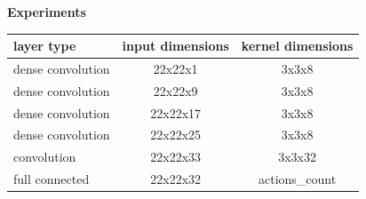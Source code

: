 \documentclass[xcolor=dvipsnames]{beamer}
\begin{document}
\begin{frame}{\bf Experiments}
  \tiny
  {
    \begin{table}[]
    \centering
    \begin{tabular}{|l|c|c|}
    \hline
    \textbf{layer type}                       & \textbf{input dimensions} & \textbf{kernel dimensions} \\ \hline
    \cellcolor[HTML]{FD6864}dense convolution & 22x22x1                   & 3x3x8                      \\ \hline
    \cellcolor[HTML]{FD6864}dense convolution & 22x22x9                  & 3x3x8                      \\ \hline
    \cellcolor[HTML]{FD6864}dense convolution & 22x22x17                  & 3x3x8                      \\ \hline
    \cellcolor[HTML]{FD6864}dense convolution & 22x22x25                  & 3x3x8                      \\ \hline
    \cellcolor[HTML]{34CDF9}convolution       & 22x22x33                  & 3x3x32                     \\ \hline
    \cellcolor[HTML]{67FD9A}full connected    & 22x22x32                  & actions\_count             \\ \hline
    \end{tabular}
    \end{table}
  }

\end{frame}
\end{document}
